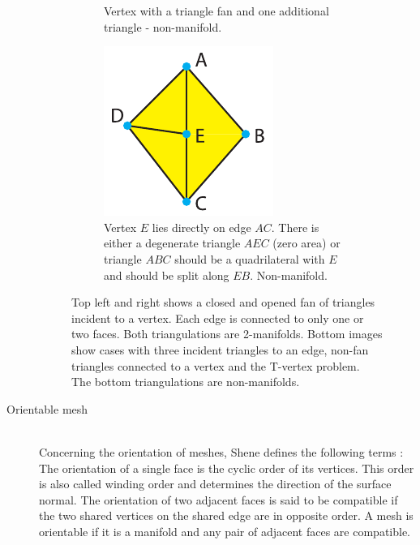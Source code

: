 \begin{description}
\begin{figure}[H]
\begin{subfigure}[t]{0.32\textwidth}
			\caption{
				Vertex with a triangle fan and one additional triangle - non-manifold.
			}
			\label{fig:non_manifold_vertex}
		\end{subfigure}
		\begin{subfigure}[t]{0.32\textwidth}
			\centering
			\includegraphics[width=\textwidth]{images/t_vertex}
			\caption{
				Vertex $E$ lies directly on edge $AC$.
				There is either a degenerate triangle $AEC$ (zero area) or triangle $ABC$ should be a quadrilateral with $E$ and should be split along $EB$.
				Non-manifold.
				}
			\label{fig:t_vertex}
		\end{subfigure}
		\caption{
			Top left and right shows a closed and opened fan of triangles incident to a vertex.
			Each edge is connected to only one or two faces.
			Both triangulations are 2-manifolds.
			Bottom images show cases with three incident triangles to an edge, non-fan triangles connected to a vertex and the T-vertex problem.
			The bottom triangulations are non-manifolds.
		}
		\label{fig:manifold}
	\end{figure}
	
	
	\item[Orientable mesh] \hfill \\
	Concerning the orientation of meshes, Shene defines the following terms \cite{mesh_basics}:
	The orientation of a single face is the cyclic order of its vertices.
	This order is also called winding order and determines the direction of the surface normal.
	The orientation of two adjacent faces is said to be compatible if the two shared vertices on the shared edge are in opposite order.
	A mesh is orientable if it is a manifold and any pair of adjacent faces are compatible.
	

\end{description}
